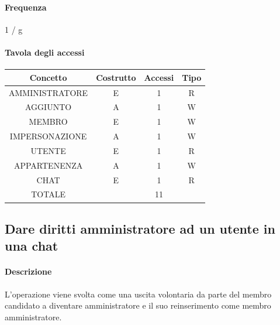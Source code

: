 \documentclass[a4paper,12pt]{report}
\begin{document}
\paragraph{Frequenza} 1 / g
\begin{table}[H]
\paragraph{Tavola degli accessi\newline}
\begin{tabular}{|c|c|c|c|}
\hline
Concetto       & Costrutto & Accessi & Tipo \\ \hline
AMMINISTRATORE & E         & 1       & R    \\ \hline
AGGIUNTO       & A         & 1       & W    \\ \hline
MEMBRO         & E         & 1       & W    \\ \hline
IMPERSONAZIONE & A         & 1       & W    \\ \hline
UTENTE         & E         & 1       & R    \\ \hline
APPARTENENZA   & A         & 1       & W    \\ \hline
CHAT           & E         & 1       & R    \\ \hline
TOTALE         &           & 11      &      \\ \hline
\end{tabular}
\end{table}
\subsection{Dare diritti amministratore ad un utente in una chat} \label{fare_amministratore}
\paragraph{Descrizione} L'operazione viene svolta come una uscita volontaria da parte del membro candidato a diventare amministratore e il suo reinserimento come membro amministratore.
\end{document}
